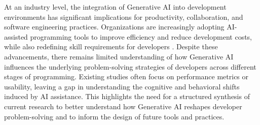 At an industry level, the integration of Generative AI into development environments has significant implications for productivity, collaboration, and software engineering practices. Organizations are increasingly adopting AI-assisted programming tools to improve efficiency and reduce development costs, while also redefining skill requirements for developers \cite{bird2023copilot, nocode2023industry}. Despite these advancements, there remains limited understanding of how Generative AI influences the underlying problem-solving strategies of developers across different stages of programming. Existing studies often focus on performance metrics or usability, leaving a gap in understanding the cognitive and behavioral shifts induced by AI assistance. This highlights the need for a structured synthesis of current research to better understand how Generative AI reshapes developer problem-solving and to inform the design of future tools and practices.